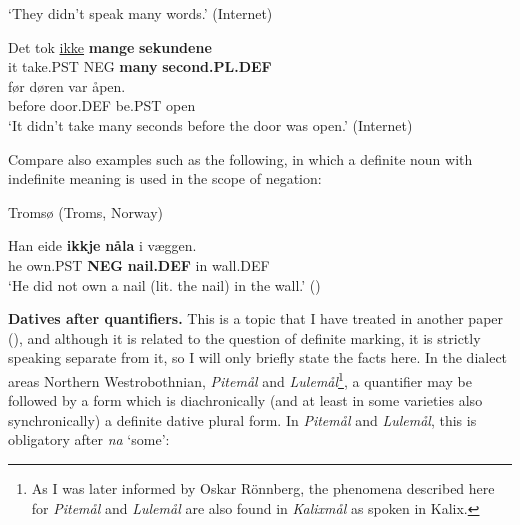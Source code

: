 \glt ‘They didn’t speak many words.’ (Internet)

\z

\item 


 \ea\label{}
\gll Det  tok  \href{http://kh.hd.uib.no/cgi-dos/roman-bm.bat?P18543500#here}{ikke}  \textbf{mange} \textbf{sekundene}\\


it  take.PST  NEG  \textbf{many} \textbf{second.PL.DEF}\\

 \ea\label{}
\gll før  døren  var  åpen.\\


before  door.DEF  be.PST  open\\

\glt  ‘It didn’t take many seconds before the door was open.’ (Internet)

\z

Compare also examples such as the following, in which a definite noun with indefinite meaning is used in the scope of negation:


\item 

Tromsø (Troms, Norway)



 \ea\label{}
\gll Han  eide  \textbf{ikkje} \textbf{nåla} i  væggen.\\


he  own.PST  \textbf{NEG} \textbf{nail.DEF} in  wall.DEF\\

\glt ‘He did not own a nail (lit. the nail) in the wall.’ (\citet[18]{Iversen1918})

\z

\textbf{Datives after quantifiers. }This is a topic that I have treated in another paper (\citet{Dahl2008}), and although it is related to the question of definite marking, it is strictly speaking separate from it, so I will only briefly state the facts here. In the dialect areas Northern Westrobothnian, \textit{Pitemål} and \textit{Lulemål}\footnote{ As I was later informed by Oskar Rönnberg, the phenomena described here for \textit{Pitemål} and \textit{Lulemål} are also found in \textit{Kalixmål}\textit{ }as spoken in Kalix.}, a quantifier may be followed by a form which is diachronically (and at least in some varieties also synchronically) a definite dative plural form. In \textit{Pitemål} and \textit{Lulemål}, this is obligatory after \textit{na} ‘some’:

